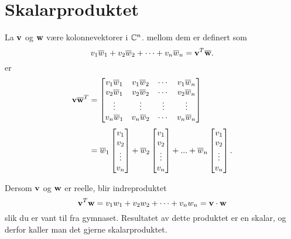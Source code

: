 

\label{ch:projeksjon}
\section*{Skalarproduktet}
La $\mathbf{v}$ og $\mathbf{w}$ være kolonnevektorer i $\mathbb{C}^n$. 
 mellom dem er definert som
\[
 v_1\overline w_1 + v_2\overline w_2 + \cdots +v_n\overline w_n=\mathbf{v}^T \overline{ \mathbf{w}}.
 \] 
  er
\begin{align*}
\mathbf{v} \overline{ \mathbf{w}}^T &=
\begin{bmatrix}
v_1 \overline w_1       & v_1 \overline w_2             & \cdots & v_1 \overline w_n \\
v_2 \overline w_1     & v_2 \overline w_2              & \cdots & v_2 \overline w_n   \\
\vdots & \vdots & \vdots  & \vdots \\
v_n \overline w_1     & v_n \overline w_2              & \cdots & v_n \overline w_n   \\
\end{bmatrix}
\\[3pt]&=
\overline w_1
\begin{bmatrix}
v_1  \\
v_2  \\
\vdots  \\
v_n  \\
\end{bmatrix}
+
\overline w_2
\begin{bmatrix}
v_1  \\
v_2  \\
\vdots  \\
v_n  \\
\end{bmatrix}
+...+
\overline w_n
\begin{bmatrix}
v_1  \\
v_2  \\
\vdots  \\
v_n  \\
\end{bmatrix}.
 \end{align*} 
 \begin{merkx}
 Dersom $\mathbf{v}$ og $\mathbf{w}$ er reelle, blir indreproduktet 
\[
\mathbf{v}^T\mathbf{w}= v_1w_1 + v_2w_2 + \cdots +v_nw_n=\mathbf{v}\cdot  \mathbf{w}
 \] 
 slik du er vant til fra gymnaset. Resultatet av dette produktet er en skalar, og derfor kaller man det gjerne skalarproduktet.  
 \end{merkx}
 
